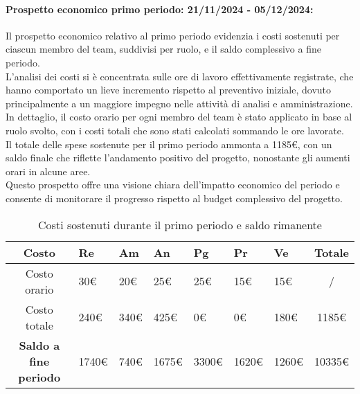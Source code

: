 \paragraph{Prospetto economico primo periodo: 21/11/2024 - 05/12/2024: }
Il prospetto economico relativo al primo periodo evidenzia i costi sostenuti per ciascun membro del team, suddivisi per ruolo, e il saldo complessivo a fine periodo.\\
L'analisi dei costi si è concentrata sulle ore di lavoro effettivamente registrate, che hanno comportato un lieve incremento rispetto al preventivo iniziale, dovuto principalmente a un maggiore impegno nelle attività di analisi e amministrazione.\\
In dettaglio, il costo orario per ogni membro del team è stato applicato in base al ruolo svolto, con i costi totali che sono stati calcolati sommando le ore lavorate.\\
Il totale delle spese sostenute per il primo periodo ammonta a 1185€, con un saldo finale che riflette l'andamento positivo del progetto, nonostante gli aumenti orari in alcune aree.\\
Questo prospetto offre una visione chiara dell'impatto economico del periodo e consente di monitorare il progresso rispetto al budget complessivo del progetto.
\begin{table}[!h]
    \centering
    \renewcommand{\arraystretch}{1.5}
    \begin{tabularx}{\textwidth}{|c|X|X|X|X|X|X|c|}\hline
    \rowcolor[HTML]{FFD700} 
    \textbf{Costo} & \textbf{Re} & \textbf{Am} & \textbf{An} & \textbf{Pg} & \textbf{Pr} & \textbf{Ve} & \textbf{Totale} \\ \hline
    Costo orario & 30€ & 20€ & 25€ & 25€ & 15€ & 15€ & /  \\ \hline
    Costo totale & 240€ & 340€ & 425€ & 0€ & 0€ & 180€ & 1185€ \\ \hline
    \rowcolor[HTML]{FFD700} 
    \textbf{Saldo a fine periodo}  & 1740€ & 740€ & 1675€ & 3300€ & 1620€ & 1260€ & 10335€ \\ \hline
    \end{tabularx}
    \caption{Costi sostenuti durante il primo periodo e saldo rimanente}
\end{table}


